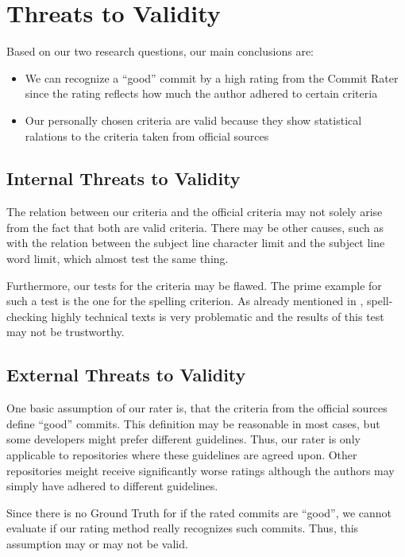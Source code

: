 \section{Threats to Validity}
\label{sec:threats-to-validity}
%

Based on our two research questions, our main conclusions are:
\begin{itemize}
  \item We can recognize a ``good'' commit by a high rating from the Commit Rater since the rating reflects how much the author adhered to certain criteria
  \item Our personally chosen criteria are valid because they show statistical ralations to the criteria taken from official sources
\end{itemize}


\subsection{Internal Threats to Validity}
The relation between our criteria and the official criteria may not solely arise from the fact that both are valid criteria. There may be other causes, such as with the relation between the subject line character limit and the subject line word limit, which almost test the same thing.

Furthermore, our tests for the criteria may be flawed. The prime example for such a test is the one for the spelling criterion. As already mentioned in \label{subs:no_misspelling}, spell-checking highly technical texts is very problematic and the results of this test may not be trustworthy.

\subsection{External Threats to Validity}
One basic assumption of our rater is, that the criteria from the official sources define ``good'' commits. This definition may be reasonable in most cases, but some developers might prefer different guidelines. Thus, our rater is only applicable to repositories where these guidelines are agreed upon. Other repositories meight receive significantly worse ratings although the authors may simply have adhered to different guidelines.

Since there is no Ground Truth for if the rated commits are ``good'', we cannot evaluate if our rating method really recognizes such commits. Thus, this assumption may or may not be valid.

